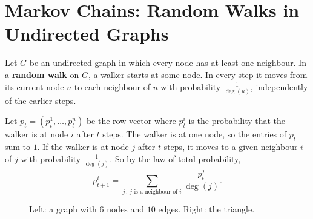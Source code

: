 \section{Markov Chains: Random Walks in Undirected Graphs}

\begin{definition}
    Let $G$ be an undirected graph in which every node has at least one neighbour. In a
    \textbf{random walk} on $G$, a walker starts at some node. In every step it moves from its
    current node $u$ to each neighbour of $u$ with probability $\frac{1}{\deg(u)}$, independently
    of the earlier steps.
\end{definition}

Let $p_t = (p_t^1, \dots, p_t^n)$ be the row vector where $p_t^i$ is the probability that the walker
is at node $i$ after $t$ steps. The walker is at one node, so the entries of $p_t$ sum to $1$. If
the walker is at node $j$ after $t$ steps, it moves to a given neighbour $i$ of $j$ with probability
$\frac{1}{\deg(j)}$. So by the law of total probability,
\begin{equation}\label{eq:walkstep-0908}
    p_{t+1}^i = \sum_{j \,:\, j \text{ is a neighbour of } i} \frac{p_t^j}{\deg(j)}.
\end{equation}

\begin{figure}[ht]
    \centering
    \caption{Left: a graph with $6$ nodes and $10$ edges. Right: the triangle.}
    \label{fig:walks-0908}
\end{figure}

